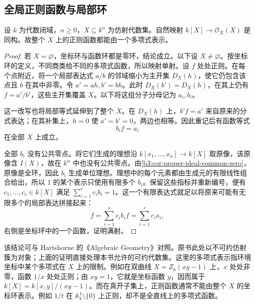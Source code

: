 \subsection{全局正则函数与局部环}
\label{b3:subsec:0702:02}

\begin{theorem}\label{b3:thm:affine-global-regular}
	设 \(k\) 为代数闭域，\(n\ge0\)，\(X\subseteq k^n\) 为仿射代数集。自然映射 \(k[X]\to\mathcal O_X(X)\) 是同构。故整个 \(X\) 上的正则函数都能由一个多项式表示。
\end{theorem}
\begin{proof}
	若 \(X=\varnothing\)，坐标环与函数环都是零环，结论成立。以下设 \(X\ne\varnothing\)。按坐标环的定义，不同商类给不同的多项式函数，所以映射单射。设 \(f\) 处处正则。在每个点附近，将一个局部表达式 \(a/b\) 的邻域缩小为主开集 \(D_X(h)\)，使它仍包含该点且 \(b\) 在其中非零。令 \(a'=ah,b'=bh\)。此时 \(D_X(b')=D_X(h)\)，在其上仍有 \(f=a'/b'\)，这些主开集覆盖 \(X\)。以下将这组分子分母记为 \(a_i,b_i\)。

	这一改写也将局部等式延伸到了整个 \(X\)。在 \(D_X(h)\) 上，\(b'f=a'\) 来自原来的分式表达；在其补集上，\(h=0\) 使 \(a'=b'=0\)，两边也相等。因此重记后有函数等式
	\[
		b_i f=a_i
	\]
	在全部 \(X\) 上成立。

	全部 \(b_i\) 没有公共零点。将它们生成的理想沿 \(k[x_1,\ldots,x_n]\to k[X]\) 取原像，该原像含 \(I(X)\)，故在 \(k^n\) 中也没有公共零点。由\cref{b3:cor:proper-ideal-common-zero}，原像是全环，因此 \(b_i\) 生成单位理想。理想中的每个元素都由生成元的有限线性组合给出，所以 \(1\) 的某个表示只使用有限多个 \(b_i\)。保留这些指标并重新编号，便有 \(c_1,\ldots,c_r\in k[X]\) 满足 \(\sum_{i=1}^r c_i b_i=1\)。这一个有限表达式就足以将原来可能有无限多个的局部表达拼接起来：
	\[
		f=\sum_{i=1}^r c_i b_i f=\sum_{i=1}^r c_i a_i,
	\]
	右侧是坐标环中的一个函数，证明满射。
\end{proof}

该结论可与 Hartshorne 的《Algebraic Geometry》\cite[Chapter I, Theorem 3.2(a), p. 17]{Hartshorne1977}对照。原书此处以不可约仿射簇为对象；上面的证明直接处理本书允许的可约代数集。这里的多项式表示指环境坐标中某个多项式在 \(X\) 上的限制。例如在双曲线 \(X=Z_k(xy-1)\) 上，\(x\) 处处非零，函数 \(1/x\) 处处正则；由 \(xy=1\)，它就是坐标函数 \(y\)，因而属于 \(k[X]=k[x,y]/(xy-1)\)。而在真开子集上，正则函数通常不能由整个 \(X\) 的坐标环表示。例如 \(1/t\) 在 \(\mathbb A_k^1\setminus\{0\}\) 上正则，却不是全直线上的多项式函数。

